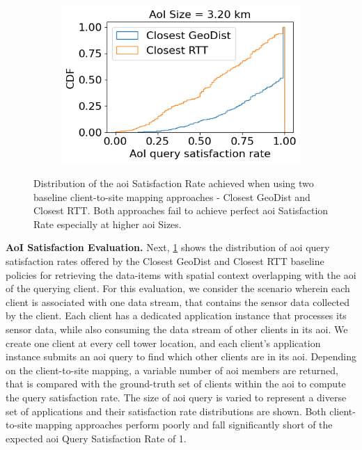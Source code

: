 \begin{figure}
\begin{subfigure}{0.333\textwidth}
  \includegraphics[width=\linewidth]{figures/mechanisms/spatial_ctx_mgmt/aoi_satisfaction_rate_cdf_AOI_3_200_km.png}
  \caption{}
\end{subfigure}
\caption{Distribution of the \gls{aoi} Satisfaction Rate achieved when using two baseline client-to-site mapping approaches - Closest GeoDist and Closest RTT. Both approaches fail to achieve perfect \gls{aoi} Satisfaction Rate especially at higher \gls{aoi} Sizes.}
\label{fig:aoi_satisfaction_rate_eval}
\end{figure}

\par \noindent \textbf{AoI Satisfaction Evaluation.} Next, \cref{fig:aoi_satisfaction_rate_eval} shows the distribution of \gls{aoi} query satisfaction rates offered by the Closest GeoDist and Closest RTT baseline policies for retrieving the data-items with spatial context overlapping with the \gls{aoi} of the querying client. For this evaluation, we consider the scenario wherein each client is associated with one data stream, that contains the sensor data collected by the client. Each client has a dedicated application instance that processes its sensor data, while also consuming the data stream of other clients in its \gls{aoi}. We create one client at every cell tower location, and each client's application instance submits an \gls{aoi} query to find which other clients are in its \gls{aoi}. Depending on the client-to-site mapping, a variable number of \gls{aoi} members are returned, that is compared with the ground-truth set of clients within the \gls{aoi} to compute the query satisfaction rate. The size of \gls{aoi} query is varied to represent a diverse set of applications and their satisfaction rate distributions are shown. Both client-to-site mapping approaches perform poorly and fall significantly short of the expected \gls{aoi} Query Satisfaction Rate of 1.

